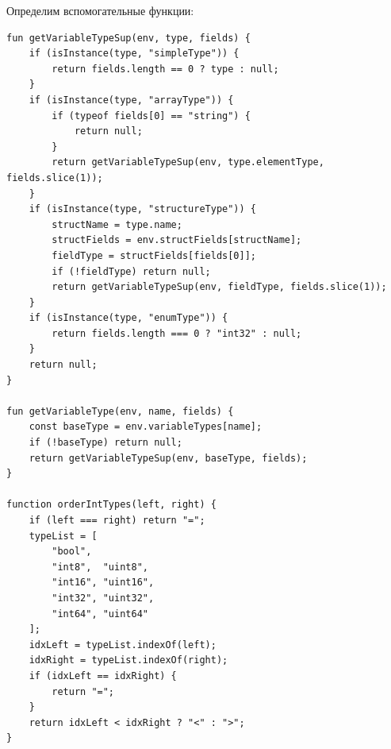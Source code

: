 Определим вспомогательные функции:
\begin{lstlisting}
fun getVariableTypeSup(env, type, fields) {
    if (isInstance(type, "simpleType")) {
        return fields.length == 0 ? type : null;
    }
    if (isInstance(type, "arrayType")) {
        if (typeof fields[0] == "string") {
            return null;
        }
        return getVariableTypeSup(env, type.elementType, fields.slice(1));
    }
    if (isInstance(type, "structureType")) {
        structName = type.name;
        structFields = env.structFields[structName];
        fieldType = structFields[fields[0]];
        if (!fieldType) return null;
        return getVariableTypeSup(env, fieldType, fields.slice(1));
    }
    if (isInstance(type, "enumType")) {
        return fields.length === 0 ? "int32" : null;
    }
    return null; 
}

fun getVariableType(env, name, fields) {
    const baseType = env.variableTypes[name];
    if (!baseType) return null;
    return getVariableTypeSup(env, baseType, fields);
}

function orderIntTypes(left, right) {
    if (left === right) return "=";
    typeList = [
        "bool",
        "int8",  "uint8",
        "int16", "uint16",
        "int32", "uint32",
        "int64", "uint64"
    ];
    idxLeft = typeList.indexOf(left);
    idxRight = typeList.indexOf(right);
    if (idxLeft == idxRight) {
        return "=";
    }
    return idxLeft < idxRight ? "<" : ">";
}


\end{lstlisting}
